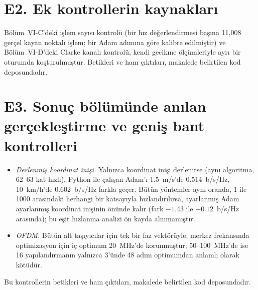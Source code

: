 \documentclass[journal,onecolumn]{IEEEtran}
\begin{document}
\section*{E2. Ek kontrollerin kaynakları}
Bölüm~VI-C'deki işlem sayısı kontrolü (bir hız değerlendirmesi başına 11{,}008 gerçel kayan noktalı işlem; bir Adam adımına göre kalibre edilmiştir) ve Bölüm~VI-D'deki Clarke kanalı kontrolü, kendi gecikme ölçümleriyle ayrı bir oturumda koşturulmuştur. Betikleri ve ham çıktıları, makalede belirtilen kod deposundadır.

\section*{E3. Sonuç bölümünde anılan gerçekleştirme ve geniş bant kontrolleri}
\begin{itemize}
\item \emph{Derlenmiş koordinat inişi.} Yalnızca koordinat inişi derlenirse (aynı algoritma, 62--63 kat hızlı), Python ile çalışan Adam'ı 1.5~m/s'de 0.514~b/s/Hz, 10~km/h'de 0.602~b/s/Hz farkla geçer. Bütün yöntemler aynı oranda, 1 ile 1000 arasındaki herhangi bir katsayıyla hızlandırılırsa, ayarlanmış Adam ayarlanmış koordinat inişinin önünde kalır (fark $-1.43$ ile $-0.12$~b/s/Hz arasında); bu eşit hızlanma analizi ön kayda alınmamıştır.
\item \emph{OFDM.} Bütün alt taşıyıcılar için tek bir faz vektörüyle, merkez frekansında optimizasyon için iç optimum 20~MHz'de korunmuştur; 50--100~MHz'de ise 16 yapılandırmanın yalnızca 3'ünde 48 adım optimumdan anlamlı olarak kötüdür.
\end{itemize}
Bu kontrollerin betikleri ve ham çıktıları, makalede belirtilen kod deposundadır.
\end{document}

